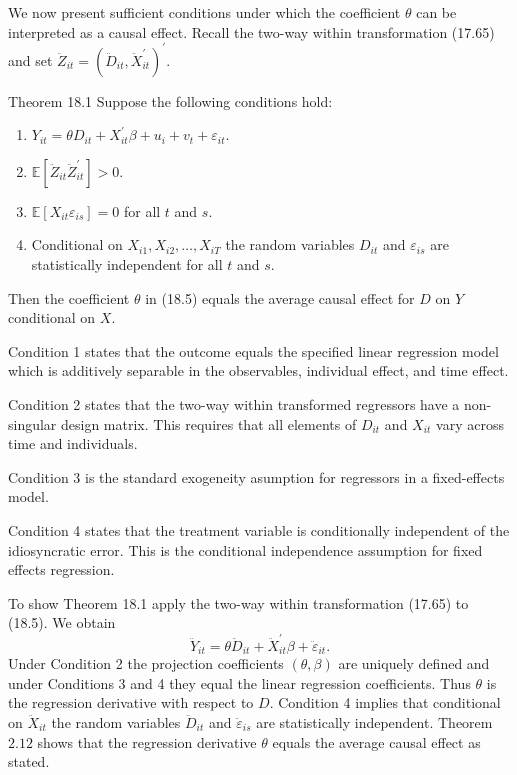 \documentclass[10pt]{article}
\begin{document}
We now present sufficient conditions under which the coefficient $\theta$ can be interpreted as a causal effect. Recall the two-way within transformation (17.65) and set $\ddot{Z}_{i t}=\left(\ddot{D}_{i t}, \ddot{X}_{i t}^{\prime}\right)^{\prime}$.

Theorem 18.1 Suppose the following conditions hold:

\begin{enumerate}
  \item $Y_{i t}=\theta D_{i t}+X_{i t}^{\prime} \beta+u_{i}+v_{t}+\varepsilon_{i t}$.

  \item $\mathbb{E}\left[\ddot{Z}_{i t} \ddot{Z}_{i t}^{\prime}\right]>0$.

  \item $\mathbb{E}\left[X_{i t} \varepsilon_{i s}\right]=0$ for all $t$ and $s$.

  \item Conditional on $X_{i 1}, X_{i 2}, \ldots, X_{i T}$ the random variables $D_{i t}$ and $\varepsilon_{i s}$ are statistically independent for all $t$ and $s$.

\end{enumerate}
Then the coefficient $\theta$ in (18.5) equals the average causal effect for $D$ on $Y$ conditional on $X$.

Condition 1 states that the outcome equals the specified linear regression model which is additively separable in the observables, individual effect, and time effect.

Condition 2 states that the two-way within transformed regressors have a non-singular design matrix. This requires that all elements of $D_{i t}$ and $X_{i t}$ vary across time and individuals.

Condition 3 is the standard exogeneity asumption for regressors in a fixed-effects model.

Condition 4 states that the treatment variable is conditionally independent of the idiosyncratic error. This is the conditional independence assumption for fixed effects regression.

To show Theorem 18.1 apply the two-way within transformation (17.65) to (18.5). We obtain
$$
\ddot{Y}_{i t}=\theta \ddot{D}_{i t}+\ddot{X}_{i t}^{\prime} \beta+\ddot{\varepsilon}_{i t} .
$$
Under Condition 2 the projection coefficients $(\theta, \beta)$ are uniquely defined and under Conditions 3 and 4 they equal the linear regression coefficients. Thus $\theta$ is the regression derivative with respect to $D$. Condition 4 implies that conditional on $\ddot{X}_{i t}$ the random variables $\ddot{D}_{i t}$ and $\ddot{\varepsilon}_{i s}$ are statistically independent. Theorem $2.12$ shows that the regression derivative $\theta$ equals the average causal effect as stated.
\end{document}
